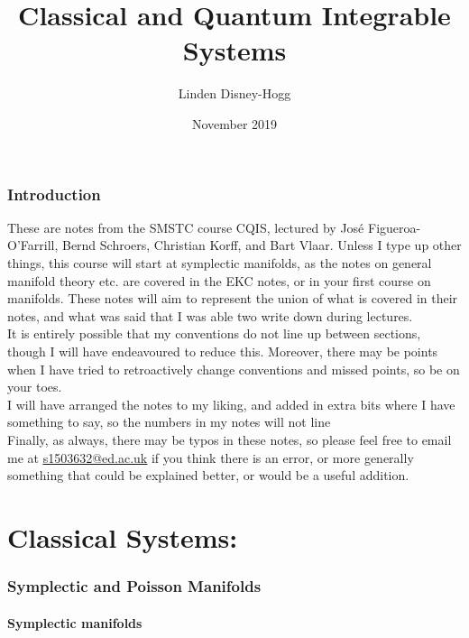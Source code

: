 \documentclass{article}
\title{Classical and Quantum Integrable Systems}
\author{Linden Disney-Hogg}
\date{November 2019}
\begin{document}
\maketitle
\tableofcontents

\section{Introduction}
These are notes from the SMSTC course CQIS, lectured by Jos\'e Figueroa-O'Farrill, Bernd Schroers, Christian Korff, and Bart Vlaar. Unless I type up other things, this course will start at symplectic manifolds, as the notes on general manifold theory etc. are covered in the EKC notes, or in your first course on manifolds. These notes will aim to represent the union of what is covered in their notes, and what was said that I was able two write down during lectures. \\
It is entirely possible that my conventions do not line up between sections, though I will have endeavoured to reduce this. Moreover, there may be points when I have tried to retroactively change conventions and missed points, so be on your toes. \\
I will have arranged the notes to my liking, and added in extra bits where I have something to say, so the numbers in my notes will not line \\
Finally, as always, there may be typos in these notes, so please feel free to email me at \href{mailto:s1504632@ed.ac.uk}{\underline{s1503632@ed.ac.uk}} if you think there is an error, or more generally something that could be explained better, or would be a useful addition. 

\part{Classical Systems:}
\section{Symplectic and Poisson Manifolds}
\subsection{Symplectic manifolds}
\end{document}

